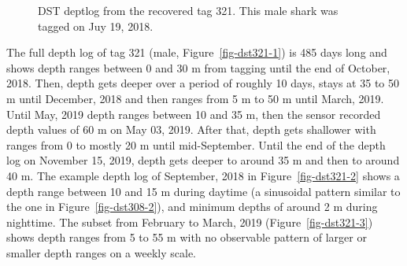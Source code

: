 \documentclass[
  authoryear,
  review,
  3p]{elsarticle}
\begin{document}
\begin{figure}

\begin{minipage}[t]{\linewidth}

{\centering 


}

\end{minipage}%
\newline
\begin{minipage}[t]{0.50\linewidth}

{\centering 


}

\end{minipage}%
%
\begin{minipage}[t]{0.50\linewidth}

{\centering 


}

\end{minipage}%

\caption{\label{fig-dst321}DST deptlog from the recovered tag 321. This
male shark was tagged on Juy 19, 2018.}

\end{figure}

The full depth log of tag 321 (male, Figure~\ref{fig-dst321-1}) is 485
days long and shows depth ranges between 0 and 30 m from tagging until
the end of October, 2018. Then, depth gets deeper over a period of
roughly 10 days, stays at 35 to 50 m until December, 2018 and then
ranges from 5 m to 50 m until March, 2019. Until May, 2019 depth ranges
between 10 and 35 m, then the sensor recorded depth values of 60 m on
May 03, 2019. After that, depth gets shallower with ranges from 0 to
mostly 20 m until mid-September. Until the end of the depth log on
November 15, 2019, depth gets deeper to around 35 m and then to around
40 m. The example depth log of September, 2018 in
Figure~\ref{fig-dst321-2} shows a depth range between 10 and 15 m during
daytime (a sinusoidal pattern similar to the one in
Figure~\ref{fig-dst308-2}), and minimum depths of around 2 m during
nighttime. The subset from February to March, 2019
(Figure~\ref{fig-dst321-3}) shows depth ranges from 5 to 55 m with no
observable pattern of larger or smaller depth ranges on a weekly scale.
\end{document}
